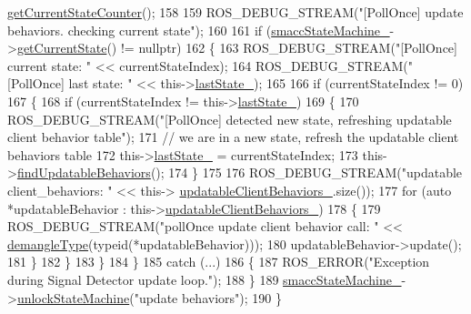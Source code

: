 \begin{DoxyCode}
      \hyperlink{classsmacc_1_1ISmaccStateMachine_a03966e531cefc1e096bffa46111871d2}{getCurrentStateCounter}();
158 
159         ROS\_DEBUG\_STREAM(\textcolor{stringliteral}{"[PollOnce] update behaviors. checking current state"});
160 
161         \textcolor{keywordflow}{if} (\hyperlink{classsmacc_1_1SignalDetector_a46025de6ac7b5980e22144f9703236a4}{smaccStateMachine\_}->\hyperlink{classsmacc_1_1ISmaccStateMachine_ad150bf5c87f3c8f3cadd716e571d858e}{getCurrentState}() != \textcolor{keyword}{nullptr})
162         \{
163             ROS\_DEBUG\_STREAM(\textcolor{stringliteral}{"[PollOnce] current state: "} << currentStateIndex);
164             ROS\_DEBUG\_STREAM(\textcolor{stringliteral}{"[PollOnce] last state: "} << this->\hyperlink{classsmacc_1_1SignalDetector_a72293ed0e98f4200fbe75b53f1e41eab}{lastState\_});
165 
166             \textcolor{keywordflow}{if} (currentStateIndex != 0)
167             \{
168                 \textcolor{keywordflow}{if} (currentStateIndex != this->\hyperlink{classsmacc_1_1SignalDetector_a72293ed0e98f4200fbe75b53f1e41eab}{lastState\_})
169                 \{
170                     ROS\_DEBUG\_STREAM(\textcolor{stringliteral}{"[PollOnce] detected new state, refreshing updatable client behavior
       table"});
171                     \textcolor{comment}{// we are in a new state, refresh the updatable client behaviors table}
172                     this->\hyperlink{classsmacc_1_1SignalDetector_a72293ed0e98f4200fbe75b53f1e41eab}{lastState\_} = currentStateIndex;
173                     this->\hyperlink{classsmacc_1_1SignalDetector_a7e1301b9d23a522f18385368421c83f5}{findUpdatableBehaviors}();
174                 \}
175 
176                 ROS\_DEBUG\_STREAM(\textcolor{stringliteral}{"updatable client\_behaviors: "} << this->
      \hyperlink{classsmacc_1_1SignalDetector_a9dce129da8c8a9971416a8f498132c23}{updatableClientBehaviors\_}.size());
177                 \textcolor{keywordflow}{for} (\textcolor{keyword}{auto} *updatableBehavior : this->\hyperlink{classsmacc_1_1SignalDetector_a9dce129da8c8a9971416a8f498132c23}{updatableClientBehaviors\_})
178                 \{
179                     ROS\_DEBUG\_STREAM(\textcolor{stringliteral}{"pollOnce update client behavior call: "} << 
      \hyperlink{namespacesmacc_1_1introspection_a670e39ccea29952859df4e2d0e45077b}{demangleType}(\textcolor{keyword}{typeid}(*updatableBehavior)));
180                     updatableBehavior->update();
181                 \}
182             \}
183         \}
184     \}
185     \textcolor{keywordflow}{catch} (...)
186     \{
187         ROS\_ERROR(\textcolor{stringliteral}{"Exception during Signal Detector update loop."});
188     \}
189     \hyperlink{classsmacc_1_1SignalDetector_a46025de6ac7b5980e22144f9703236a4}{smaccStateMachine\_}->\hyperlink{classsmacc_1_1ISmaccStateMachine_ae2e3ceb87bfe3f9d8bf320e36071fdc7}{unlockStateMachine}(\textcolor{stringliteral}{"update behaviors"});
190 \}
\end{DoxyCode}



